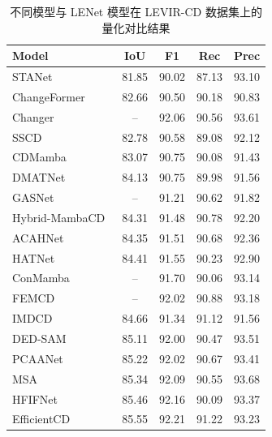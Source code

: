 \begin{table}[!htb]
  \centering
  \caption{不同模型与 LENet 模型在 LEVIR-CD 数据集上的量化对比结果}
  \label{tab:lenet_levir}
  \begin{tabular}{lcccc}
    \toprule
    Model                   &   IoU   &   F1   &   Rec   &  Prec   \\
    \midrule
    STANet~\cite{chen_spatial-temporal_2020}        &  81.85  &  90.02 &  87.13  &  93.10  \\
    ChangeFormer~\cite{bandara2022transformer}  &  82.66  &  90.50 &  90.18  &  90.83  \\
    Changer~\cite{Fang2022ChangerFI}       &   --    &  92.06 &  90.56  &  93.61  \\
    SSCD~\cite{Wang2024SummatorSubtractorNM}          &  82.78  &  90.58 &  89.08  &  92.12  \\
    CDMamba~\cite{zhang_cdmamba_2025}       &  83.07  &  90.75 &  90.08  &  91.43  \\
    DMATNet~\cite{Song2022RemoteSI}       &  84.13  &  90.75 &  89.98  &  91.56  \\
    GASNet~\cite{zhang_global-aware_2023}        &   --    &  91.21 &  90.62  &  91.82  \\
    Hybrid-MambaCD~\cite{Feng2025HybridMambaCDHM} &  84.31  &  91.48 &  90.78  &  92.20  \\
    ACAHNet~\cite{Zhang2023AsymmetricCH}       &  84.35  &  91.51 &  90.68  &  92.36  \\
    HATNet~\cite{Xu2024HybridAT}        &  84.41  &  91.55 &  90.23  &  92.90  \\
    ConMamba~\cite{Dong2024ConMambaCA}      &   --    &  91.70 &  90.06  &  93.14  \\
    FEMCD~\cite{Xing2025FrequencyEnhancedMF}         &   --    &  92.02 &  90.88  &  93.18  \\
    IMDCD~\cite{Liu2024IterativeMD}         &  84.66  &  91.34 &  91.12  &  91.56  \\
    DED-SAM~\cite{Qiu2025DEDSAMAdaptingSA}       &  85.11  &  92.00 &  90.47  &  93.51  \\
    PCAANet~\cite{Xu2023ProgressiveCA}       &  85.22  &  92.02 &  90.67  &  93.41  \\
    MSA~\cite{Huang2025MSAMS}           &  85.34  &  92.09 &  90.55  &  93.68  \\
    HFIFNet~\cite{Han2025HFIFNetHF}       &  85.46  &  92.16 &  90.09  &  93.37  \\
    EfficientCD~\cite{dong_efficientcd_2024}   &  85.55  &  92.21 &  91.22  &  93.23  \\

\end{tabular}
\end{table}
